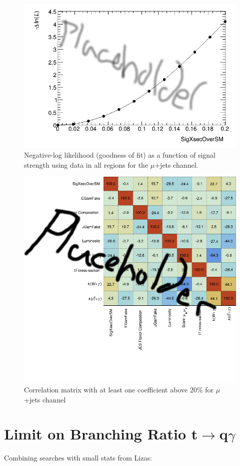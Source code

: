 \begin{figure}[h!]
	\centering
	\includegraphics[width=.5\columnwidth]{../ThesisImages/RegionPlots/FinalRegions/FCNC_All_mujets/LHoodPlots/NLLscan_SigXsecOverSM.png}
	\caption{Negative-log likelihood (goodness of fit) as a function of signal strength using data in all regions for the $\mu$+jets channel.}
	\label{fig:NLLmujets}
\end{figure}

\begin{figure}[h!]
	\centering
	\includegraphics[width=.5\columnwidth]{../ThesisImages/RegionPlots/FinalRegions/FCNC_All_mujets/CorrMatrix.png}
	\caption[Correlation matrix  with at least one coefficient above 20\% for $\mu$+jets channel]{Correlation matrix  with at least one coefficient above 20\% for $\mu$+jets channel }
	\label{fig:Corrmujets}
\end{figure}

\section{Limit on Branching Ratio t$\rightarrow$q$\gamma$}
\label{sec:Limits}
Combining searches with small stats from Lizas: \cite{Junk:1999kv}

%

